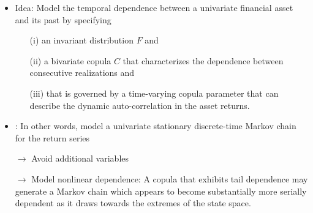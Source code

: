 \documentclass[9pt,xcolor=x11names,compress]{beamer}
\let\oldcite=\cite
\renewcommand{\cite}[1]{\textcolor{dblue}{\oldcite{#1}}}
\begin{document}
\begin{frame}{}
\begin{itemize}
	\item Idea: Model the temporal dependence between a univariate financial asset and its past by specifying 
	\begin{enumerate}
		\item[(i)] an invariant distribution $F$ and
		\item[(ii)] a bivariate copula $C$ that characterizes the dependence between consecutive realizations and
		\item[(iii)] that is governed by a time-varying copula parameter that can describe the dynamic auto-correlation in the asset returns.
	\end{enumerate}
	\item \cite{Chen2006}: In other words, model a univariate stationary discrete-time Markov chain for the return series
\end{itemize}
\begin{itemize}
	\item[$\to$] Avoid additional variables
	\item[$\to$] Model nonlinear dependence: A copula that exhibits tail dependence may generate a Markov chain which appears to become substantially more serially dependent as it draws towards the extremes of the state space.
\end{itemize}
\end{frame}

\end{document}
